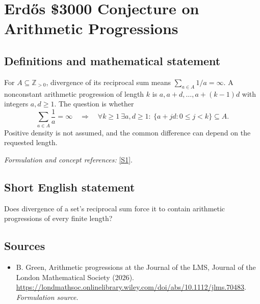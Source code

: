 \documentclass[11pt]{article}
\begin{document}
\section*{\texorpdfstring{Erdős \$3000 Conjecture on Arithmetic Progressions}{Erdős \$3000 Conjecture on Arithmetic Progressions}}\label{1857}
\subsection{Definitions and mathematical statement}
For $A\subseteq{\mathbb{Z}}_{>0}$, divergence of its reciprocal sum means $\sum_{a\in A}1/a=\infty$. A nonconstant arithmetic progression of length $k$ is $a,a+d,\ldots,a+(k-1)d$ with integers $a,d\ge1$. The question is whether
\[
 \sum_{a\in A}\frac1a=\infty\quad\Longrightarrow\quad
 \forall k\ge1\ \exists a,d\ge1:\ \{a+jd:0\le j<k\}\subseteq A.
\]
Positive density is not assumed, and the common difference can depend on the requested length.
\par\smallskip\textit{Formulation and concept references:} \href{https://londmathsoc.onlinelibrary.wiley.com/doi/abs/10.1112/jlms.70483}{[S1]}.

\subsection{Short English statement}
Does divergence of a set's reciprocal sum force it to contain arithmetic progressions of every finite length?
\subsection{Sources}
\begin{itemize}
\item[S1]B. Green, Arithmetic progressions at the Journal of the LMS, Journal of the London Mathematical Society (2026).
\url{https://londmathsoc.onlinelibrary.wiley.com/doi/abs/10.1112/jlms.70483}.
\textit{Formulation source.}
\end{itemize}
\end{document}
